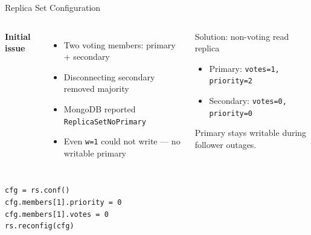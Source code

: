 \documentclass[aspectratio=169]{beamer}
\begin{document}
\begin{frame}[fragile]{Replica Set Configuration}
  \begin{columns}
      \textbf{Initial issue}
      \begin{itemize}\small
        \item Two voting members: primary + secondary
        \item Disconnecting secondary removed majority
        \item MongoDB reported \texttt{ReplicaSetNoPrimary}
        \item Even \texttt{w=1} could not write — no writable primary
      \end{itemize}
      \begin{alertblock}{Solution: non-voting read replica}
        \small
        \begin{itemize}
          \item Primary: \texttt{votes=1, priority=2}
          \item Secondary: \texttt{votes=0, priority=0}
        \end{itemize}
        \small Primary stays writable during follower outages.
      \end{alertblock}
  \end{columns}
  \vspace{0.3cm}
  \begin{lstlisting}[language={}]
cfg = rs.conf()
cfg.members[1].priority = 0
cfg.members[1].votes = 0
rs.reconfig(cfg)
  \end{lstlisting}
\end{frame}
\end{document}
